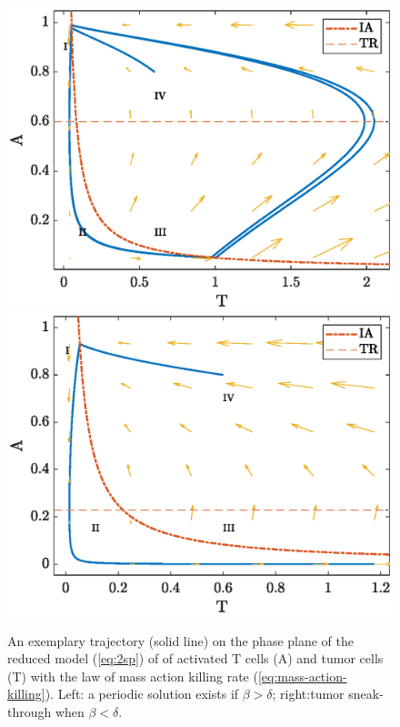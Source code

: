 \documentclass[review,authoryear]{elsarticle}
\newcommand{\red}[1]{\textcolor{red}{#1}}
\begin{document}
\begin{figure}
\centerline{\includegraphics[width=0.3\paperwidth]{figs/phase_plane_periodic_DA}\includegraphics[width=0.3\paperwidth]{figs/phase_plane_sneakthru_DA}}
\caption{An exemplary trajectory (solid line) on the phase plane of the reduced model (\ref{eq:2sp}) of of activated T cells (A) and tumor cells (T) with the law of mass action killing rate (\ref{eq:mass-action-killing}). Left: a periodic solution exists if $\beta>\delta$;
right:tumor sneak-through when $\beta<\delta$. 
\label{fig:PP-DA} }
\end{figure}
\end{document}
